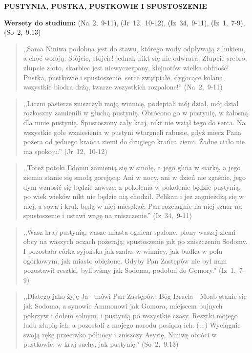 \documentclass[10pt,a4paper,oneside]{article}
\begin{document}
\centerline{\textbf{\MakeUppercase{Pustynia, pustka, pustkowie i spustoszenie}}}
\begin{center}
\textbf{Wersety do studium:} (Na~2,~9-11), (Jr~12,~10-12), (Iz~34,~9-11), (Iz~1,~7-9), (So~2,~9.13)
\end{center}
\begin{quote}
,,Sama Niniwa podobna jest do stawu, którego wody odpływają z hukiem, a choć wołają: Stójcie, stójcie! jednak nikt się nie odwraca. Złupcie srebro, złupcie złoto, skarbiec jest niewyczerpany, klejnotów wielka obfitość! Pustka, pustkowie i spustoszenie, serce zwątpiałe, dygocące kolana, wszystkie biodra drżą, twarze wszystkich rozpalone!'' (Na~2,~9-11)
\end{quote}
\begin{quote}
,,Liczni pasterze zniszczyli moją winnicę, podeptali mój dział, mój dział rozkoszny zamienili w głuchą pustynię. Obrócono go w pustynię, w żałosną dla mnie pustynię. Spustoszony cały kraj, nikt nie wziął tego do serca. Na wszystkie gołe wzniesienia w pustyni wtargnęli rabusie, gdyż miecz Pana pożera od jednego krańca ziemi do drugiego krańca ziemi. Żadne ciało nie ma spokoju.'' (Jr~12,~10-12)
\end{quote}
\begin{quote}
,,Toteż potoki Edomu zamienią się w smołę, a jego glina w siarkę, a jego ziemia stanie się smołą gorejącą: Ani w nocy, ani w dzień nie zgaśnie, jego dym wznosić się będzie zawsze; z pokolenia w pokolenie będzie pustynią, po wiek wieków nikt nie będzie nią chodził. Pelikan i jeż zagnieżdżą się w niej, a sowa i kruk będą w niej mieszkać; Pan rozciągnie na niej sznur na spustoszenie i ustawi wagę na zniszczenie.'' (Iz~34,~9-11)
\end{quote}
\begin{quote}
,,Wasz kraj pustynią, wasze miasta ogniem spalone, plony waszej ziemi obcy na waszych oczach pożerają; spustoszenie jak po zniszczeniu Sodomy. I pozostała córka syjońska jak szałas w winnicy, jak budka w polu ogórkowym, jak miasto oblężone. Gdyby Pan Zastępów nie był nam pozostawił resztki, bylibyśmy jak Sodoma, podobni do Gomory.'' (Iz~1,~7-9)
\end{quote}
\begin{quote}
,,Dlatego jako żyję Ja - mówi Pan Zastępów, Bóg Izraela - Moab stanie się jak Sodoma, a synowie Ammonowi jak Gomora, miejscem bujnych pokrzyw i dołem solnym, i pustynią po wszystkie czasy. Resztki mojego ludu złupią ich, a pozostali z mojego narodu posiądą ich. (...) Wyciągnie swoją rękę przeciwko północy i zniszczy Asyrię, Niniwę obróci w pustkowie, w kraj suchy, jak pustynię.'' (So~2,~9.13)
\end{quote}
\end{document}
